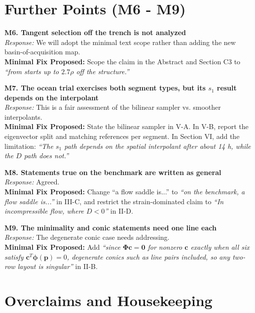 \documentclass[10pt]{article}
\begin{document}
\vspace{-0.2cm}
\section*{Further Points (M6 - M9)}

\textbf{M6. Tangent selection off the trench is not analyzed} \\
\textit{Response:} We will adopt the minimal text scope rather than adding the new basin-of-acquisition map. \\
\textbf{Minimal Fix Proposed:} Scope the claim in the Abstract and Section C3 to \textit{``from starts up to $2.7\rho$ off the structure.''}

\textbf{M7. The ocean trial exercises both segment types, but its $s_1$ result depends on the interpolant} \\
\textit{Response:} This is a fair assessment of the bilinear sampler vs. smoother interpolants. \\
\textbf{Minimal Fix Proposed:} State the bilinear sampler in V-A. In V-B, report the eigenvector split and matching references per segment. In Section VI, add the limitation: \textit{``The $s_1$ path depends on the spatial interpolant after about 14 h, while the $D$ path does not.''}

\textbf{M8. Statements true on the benchmark are written as general} \\
\textit{Response:} Agreed. \\
\textbf{Minimal Fix Proposed:} Change ``a flow saddle is...'' to \textit{``on the benchmark, a flow saddle is...''} in III-C, and restrict the strain-dominated claim to \textit{``In incompressible flow, where $D < 0$''} in II-D.

\textbf{M9. The minimality and conic statements need one line each} \\
\textit{Response:} The degenerate conic case needs addressing. \\
\textbf{Minimal Fix Proposed:} Add \textit{``since $\boldsymbol{\Phi} \mathbf{c} = \mathbf{0}$ for nonzero $\mathbf{c}$ exactly when all six satisfy $\mathbf{c}^T\boldsymbol{\phi}(\mathbf{p}) = 0$, degenerate conics such as line pairs included, so any two-row layout is singular''} in II-B.

\vspace{-0.2cm}
\section*{Overclaims and Housekeeping}
\end{document}
